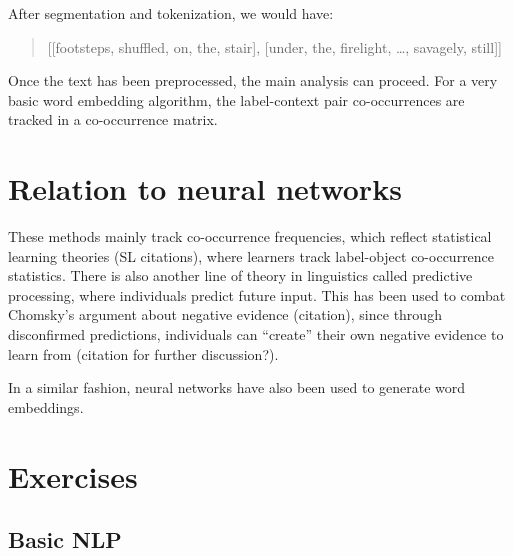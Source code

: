 
After segmentation and tokenization, we would have: 
\begin{quote}
[[footsteps, shuffled, on, the, stair], 
[under, the, firelight, \dots, savagely, still]]
\end{quote}

Once the text has been preprocessed, the main analysis can proceed. For a very basic word embedding algorithm, the label-context pair co-occurrences are tracked in a co-occurrence matrix.

\section{Relation to neural networks}


These methods mainly track co-occurrence frequencies, which reflect statistical learning theories (SL citations), where learners track label-object co-occurrence statistics.
There is also another line of theory in linguistics called predictive processing, where individuals predict future input. This has been used to combat Chomsky's argument about negative evidence (citation), since through disconfirmed predictions, individuals can ``create'' their own negative evidence to learn from (citation for further discussion?).

In a similar fashion, neural networks have also been used to generate word embeddings.





\section{Exercises}

\subsection{Basic NLP}

